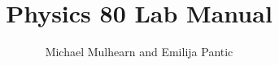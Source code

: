 \documentclass[12pt,oneside]{book}
\theoremstyle{definition}
\begin{document}

\title{Physics 80 Lab Manual}
\author{Michael Mulhearn and Emilija Pantic}
\maketitle














\end{document}
